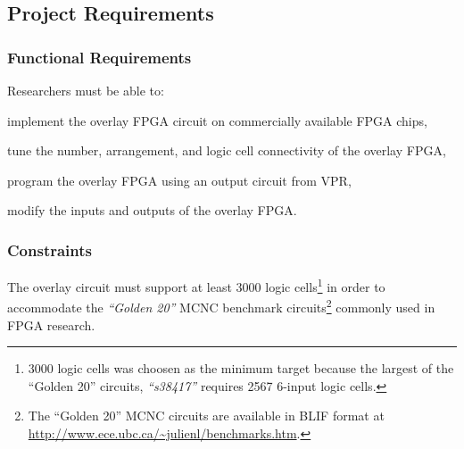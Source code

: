 \subsection{Project Requirements}

%


\subsubsection{Functional Requirements}

Researchers must be able to:
\begin{itemlist}
	\item implement the overlay FPGA circuit on commercially available FPGA chips,
	\item tune the number, arrangement, and logic cell connectivity of the overlay FPGA,
	\item program the overlay FPGA using an output circuit from VPR,
	\item modify the inputs and outputs of the overlay FPGA.
\end{itemlist}


\subsubsection{Constraints}

\begin{itemlist}
	\item The overlay circuit must support at least 3000 logic cells\footnote{3000 logic cells was choosen as the minimum target because the largest of the ``Golden 20'' circuits, \emph{``s38417''} requires 2567 6-input logic cells\cite{synthesis-density}.} in order to accommodate the \emph{``Golden 20''} MCNC benchmark circuits\footnote{The ``Golden 20'' MCNC circuits are available in BLIF format at \url{http://www.ece.ubc.ca/~julienl/benchmarks.htm}.} commonly used in FPGA research.
\end{itemlist}


